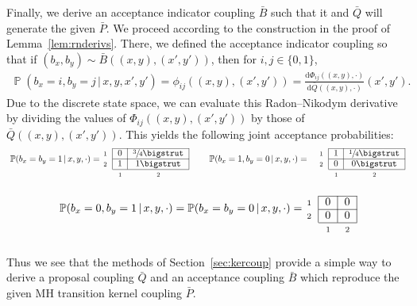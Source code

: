 \documentclass[aihp]{imsart}
\theoremstyle{plain}
\theoremstyle{remark}
\theoremstyle{definition} \newtheorem{example}{Example}
\newcommand{\eq}[1]{\begin{align*}#1\end{align*}} %
\newcommand{\ec}[1]{\begin{gather*}#1\end{gather*}} %
\renewcommand{\P}{\operatorname{\mathbb{P}}}
\newcommand{\cd}{\cdot}
\newcommand{\g}{\, | \,}
\newcommand{\diff}{\mathrm{d} } %
\newcommand{\bp}{\bar P}
\newcommand{\bq}{\bar Q}
\newcommand{\bb}{\bar B}
\newcommand{\xy}{(x,y)}
\newcommand{\xyp}{(x',y')}
\newcommand{\bxy}{(b_x,b_y)}
\begin{document}
\begin{appendix}
Finally, we derive an acceptance indicator coupling $\bb$ such that it and $\bq$ will generate the given $\bp$.
We proceed according to the construction in the proof of Lemma~\ref{lem:rnderivs}. There,
we defined the acceptance indicator coupling so that if ${\bxy \sim \bb(\xy, \xyp)}$, then for
$i,j \in \{0, 1\}$,
\eq{
	\P(b_x=i, b_y=j \g x, y, x', y') = \phi_{ij}(\xy, \xyp) = \frac{ \diff \Phi_{ij}(\xy, \cdot)}{\diff \bq(\xy, \cdot)}(x', y').
}
Due to the discrete state space, we can evaluate this Radon--Nikodym derivative by dividing the values
of $\Phi_{ij}(\xy, \xyp)$ by those of $\bq(\xy, \xyp)$. This yields the following joint acceptance
probabilities:
\begin{alignat*}{2}
	\raisebox{10pt}{ $\P( b_x=b_y=1 \g x,y, \cd) = $ } \hspace{-5pt}&
	\begin{blockarray}{rcc}
		\begin{block}{ r |c|c| }
			\cline{2-3}
			{\scriptstyle 1}  & 0 & \sfrac 3 4 \bigstrut \\
			\cline{2-3}
			{\scriptstyle 2} & 1 & 1 \bigstrut\\
			\cline{2-3}
		\end{block}
		\  & {\scriptstyle 1} & {\scriptstyle 2}
	\end{blockarray}
	\qquad
	\raisebox{10pt}{ $\P( b_x=1, b_y=0 \g x,y, \cd) = $ } \hspace{-5pt}&
	\begin{blockarray}{rcc}
		\begin{block}{ r |c|c| }
			\cline{2-3}
			{\scriptstyle 1}  & 1 & \sfrac 1 4\bigstrut \\
			\cline{2-3}
			{\scriptstyle 2} &  0 & 0 \bigstrut \\
			\cline{2-3}
		\end{block}
		\  & {\scriptstyle 1} & {\scriptstyle 2}
	\end{blockarray}
\end{alignat*}
\vspace{-1.5em}
\ec{
	\raisebox{11pt}{ $\P( b_x=0, b_y=1 \g x,y, \cd) = \P( b_x=b_y=0 \g x,y, \cd) = $ } \hspace{0pt}
	\hspace{-5pt}
	\begin{blockarray}{rcc}
		\begin{block}{ r |c|c| }
			\cline{2-3}
			{\scriptstyle 1}  & 0 & 0  \\
			\cline{2-3}
			{\scriptstyle 2} &0& 0 \\
			\cline{2-3}
		\end{block}
		\  & {\scriptstyle 1} & {\scriptstyle 2}
	\end{blockarray}
}
Thus we see that the methods of Section~\ref{sec:kercoup} provide a simple way to
derive a proposal coupling $\bq$ and an acceptance coupling $\bb$ which reproduce the given MH
transition kernel coupling $\bp$.


\end{appendix}
\end{document}
